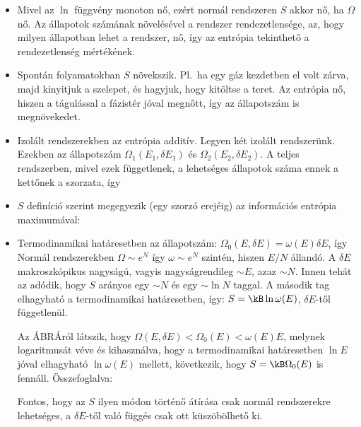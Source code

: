    \begin{itemize} 
    \item
     Mivel az $\ln$ függvény monoton nő, ezért normál rendszeren $S$ akkor nő, ha $\Omega$ nő.
   Az állapotok számának növelésével a rendszer rendezetlensége, az, hogy milyen állapotban lehet a rendszer, nő, így az entrópia tekinthető a rendezetlenség mértékének.
    
    \item
     Spontán folyamatokban $S$ növekszik.
   Pl.\ ha egy gáz kezdetben el volt zárva, majd kinyitjuk a szelepet, és hagyjuk, hogy kitöltse a teret.
   Az entrópia nő, hiszen a tágulással a fázistér jóval megnőtt, így az állapotszám is megnövekedet.
     
    \item
     Izolált rendszerekben az entrópia additív.
   Legyen két izolált rendszerünk.
   Ezekben az állapotszám $\Omega_1(E_1,\delta E_1)$ és $\Omega_2(E_2,\delta E_2)$.
   A teljes rendszerben, mivel ezek függetlenek, a lehetséges állapotok száma ennek a kettőnek a szorzata, így 
     
    \item
     $S$ definíció szerint megegyezik (egy szorzó erejéig) az információs entrópia maximumával:
     
    \item
     Termodinamikai határesetben az állapotszám: $\Omega_0(E,\delta E)=\omega(E)\delta E$, így
     Normál rendszerekben $\Omega\sim e^{N}$ így $\omega\sim e^{N}$ szintén, hiszen $E/N$ állandó.
   A $\delta E$ makroszkópikus nagyságú, vagyis nagyságrendileg $\sim E$, azaz $\sim N$.
   Innen tehát az adódik, hogy $S$ arányos egy $\sim N$ és egy $\sim\ln N$ taggal.
   A második tag elhagyható a termodinamikai határesetben, így: $S=\kB\ln\omega(E)$, $\delta E$-től függetlenül. 
     
     Az {\color{red} ÁBRÁ}ról látszik, hogy $\Omega(E,\delta E)<\Omega_0(E)<\omega(E)E$, melynek logaritmusát véve és kihasználva, hogy a termodinamikai határesetben $\ln E$ jóval elhagyható $\ln\omega(E)$ mellett, következik, hogy $S=\kB\Omega_0(E)$ is fennáll. Összefoglalva:
     
     Fontos, hogy az $S$ ilyen módon történő átírása csak normál rendszerekre lehetséges, a $\delta E$-től való függés csak ott küszöbölhető ki.
   \end{itemize}
   
